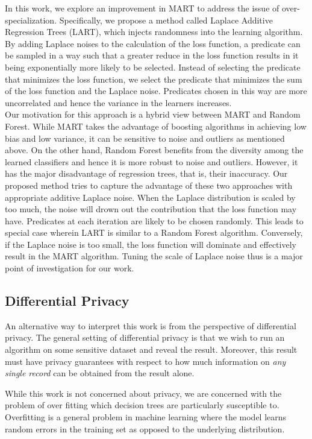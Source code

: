 \documentclass{article} %
\begin{document}
In this work, we explore an improvement in MART to address the issue of over-specialization. Specifically, we propose a method called Laplace Additive Regression Trees (LART), which injects randomness into the learning algorithm.
By adding Laplace noises to the calculation of the loss function, a predicate can be sampled in a way such that a greater reduce in the loss function results in it being exponentially more likely to be selected. Instead of selecting the predicate that minimizes the loss function, we select the predicate that minimizes the sum of the loss function and the Laplace noise. Predicates chosen in this way are more uncorrelated and hence the variance in the learners increases.\\

Our motivation for this approach is a hybrid view between MART and Random Forest. While MART takes the advantage of boosting algorithms in achieving low bias and low variance, it can be sensitive to noise and outliers as mentioned above. On the other hand, Random Forest benefits from the diversity among the learned classifiers and hence it is more robust to noise and outliers. However, it has the major disadvantage of regression trees, that is, their inaccuracy. Our proposed method tries to capture the advantage of these two approaches with appropriate additive Laplace noise. When the Laplace distribution is scaled by too much, the noise will drown out the contribution that the loss function may have. Predicates at each iteration are likely to be chosen randomly. This leads to special case wherein LART is similar to a Random Forest algorithm. Conversely, if the Laplace noise is too small, the loss function will dominate and effectively result in the MART algorithm. Tuning the scale of Laplace noise thus is a major point of investigation for our work.



\subsection{Differential Privacy }

An alternative way to interpret this work is from the perspective of differential privacy. The general setting of differential privacy is that we wish to run an algorithm on some sensitive dataset and reveal the result. Moreover, this result must have privacy guarantees with respect to how much information on \emph{any single record} can be obtained from the result alone. 

While this work is not concerned about privacy, we are concerned with the problem of over fitting which decision trees are particularly susceptible to. Overfitting is a general problem in machine learning where the model learns random errors in the training set as opposed to the underlying distribution. 
\end{document}
